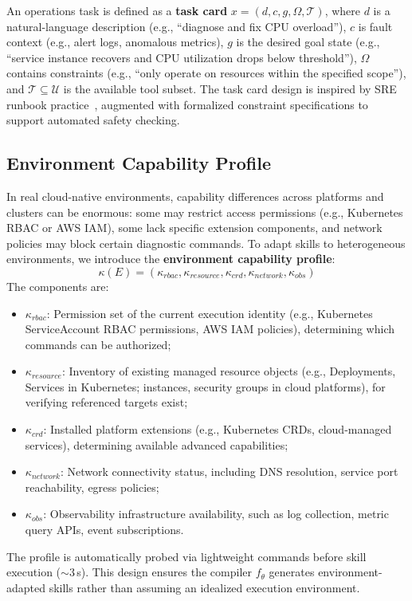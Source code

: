 \documentclass[conference,10pt]{IEEEtran}
\begin{document}
An operations task is defined as a \textbf{task card} $x = (d, c, g, \Omega, \mathcal{T})$, where $d$ is a natural-language description (e.g., ``diagnose and fix CPU overload''), $c$ is fault context (e.g., alert logs, anomalous metrics), $g$ is the desired goal state (e.g., ``service instance recovers and CPU utilization drops below threshold''), $\Omega$ contains constraints (e.g., ``only operate on resources within the specified scope''), and $\mathcal{T} \subseteq \mathcal{U}$ is the available tool subset.
The task card design is inspired by SRE runbook practice~\cite{beyer2016sre}, augmented with formalized constraint specifications to support automated safety checking.

\subsection{Environment Capability Profile}

In real cloud-native environments, capability differences across platforms and clusters can be enormous: some may restrict access permissions (e.g., Kubernetes RBAC or AWS IAM), some lack specific extension components, and network policies may block certain diagnostic commands.
To adapt skills to heterogeneous environments, we introduce the \textbf{environment capability profile}:
\begin{equation}
\kappa(E) = (\kappa_{rbac}, \kappa_{resource}, \kappa_{crd}, \kappa_{network}, \kappa_{obs})
\end{equation}
The components are:
\begin{itemize}
  \item $\kappa_{rbac}$: Permission set of the current execution identity (e.g., Kubernetes ServiceAccount RBAC permissions, AWS IAM policies), determining which commands can be authorized;
  \item $\kappa_{resource}$: Inventory of existing managed resource objects (e.g., Deployments, Services in Kubernetes; instances, security groups in cloud platforms), for verifying referenced targets exist;
  \item $\kappa_{crd}$: Installed platform extensions (e.g., Kubernetes CRDs, cloud-managed services), determining available advanced capabilities;
  \item $\kappa_{network}$: Network connectivity status, including DNS resolution, service port reachability, egress policies;
  \item $\kappa_{obs}$: Observability infrastructure availability, such as log collection, metric query APIs, event subscriptions.
\end{itemize}
The profile is automatically probed via lightweight commands before skill execution ($\sim$3\,s).
This design ensures the compiler $f_\theta$ generates environment-adapted skills rather than assuming an idealized execution environment.
\end{document}
